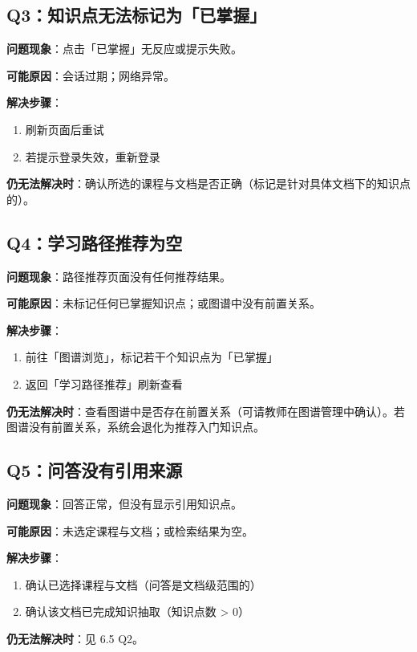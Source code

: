 \documentclass[UTF8,a4paper,11pt]{ctexrep}
\begin{document}
\subsection{Q3：知识点无法标记为「已掌握」}

\textbf{问题现象}：点击「已掌握」无反应或提示失败。

\textbf{可能原因}：会话过期；网络异常。

\textbf{解决步骤}：

\begin{enumerate}
\item 刷新页面后重试
\item 若提示登录失效，重新登录
\end{enumerate}
\textbf{仍无法解决时}：确认所选的课程与文档是否正确（标记是针对具体文档下的知识点的）。


\subsection{Q4：学习路径推荐为空}

\textbf{问题现象}：路径推荐页面没有任何推荐结果。

\textbf{可能原因}：未标记任何已掌握知识点；或图谱中没有前置关系。

\textbf{解决步骤}：

\begin{enumerate}
\item 前往「图谱浏览」，标记若干个知识点为「已掌握」
\item 返回「学习路径推荐」刷新查看
\end{enumerate}
\textbf{仍无法解决时}：查看图谱中是否存在前置关系（可请教师在图谱管理中确认）。若图谱没有前置关系，系统会退化为推荐入门知识点。


\subsection{Q5：问答没有引用来源}

\textbf{问题现象}：回答正常，但没有显示引用知识点。

\textbf{可能原因}：未选定课程与文档；或检索结果为空。

\textbf{解决步骤}：

\begin{enumerate}
\item 确认已选择课程与文档（问答是文档级范围的）
\item 确认该文档已完成知识抽取（知识点数 > 0）
\end{enumerate}
\textbf{仍无法解决时}：见 6.5 Q2。
\end{document}
